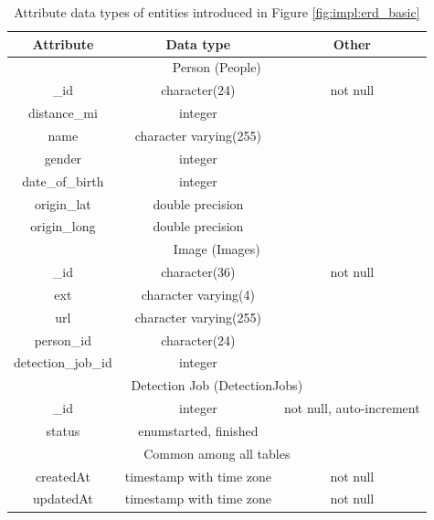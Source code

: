 \begin{table}[t]
    \begin{center}
        \begin{tabular}{ c  c  c }
            \toprule
            Attribute       & Data type              & Other \\ \toprule
            \multicolumn{3}{c}{Person (People)} \\ \midrule
            \_id           & character(24)            & not null   \\ 
            distance\_mi   & integer                  &            \\ 
            name          & character varying(255)   &            \\ 
            gender        & integer                  &            \\ 
            date\_of\_birth & integer                  &            \\ 
            origin\_lat    & double precision         &            \\ 
            origin\_long   & double precision         &            \\ 

            \midrule
            \multicolumn{3}{c}{Image (Images)} \\ \midrule
            \_id              & character(36)            & not null   \\ 
            ext              & character varying(4)     &            \\ 
            url              & character varying(255)   &            \\ 
            person\_id        & character(24)            &            \\ 
            detection\_job\_id & integer                  &            \\ 

            \midrule
            \multicolumn{3}{c}{Detection Job (DetectionJobs)} \\ \midrule
            \_id      & integer                     & not null, auto-increment \\ 
            status    & enum{started, finished}      &         \\ 

            \midrule
            \multicolumn{3}{c}{Common among all tables} \\ \midrule
            createdAt & timestamp with time zone     & not null  \\ 
            updatedAt & timestamp with time zone     & not null  \\  \bottomrule
        \end{tabular}
    \end{center}
    \caption{Attribute data types of entities introduced in Figure 
    \ref{fig:impl:erd_basic}}
    \label{table:impl:erd_basic_dt}
\end{table}
